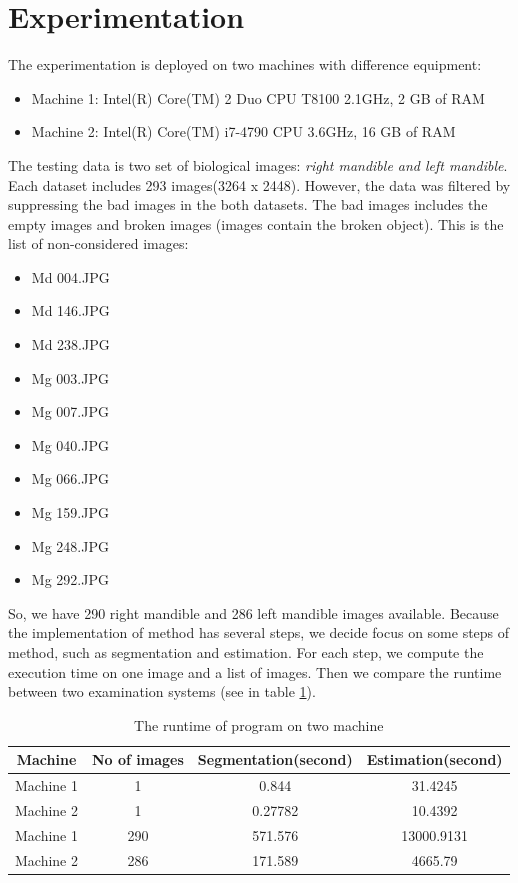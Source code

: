 \section{Experimentation}
The experimentation is deployed on two machines with difference equipment:
\begin{itemize}
\item Machine 1: Intel(R) Core(TM) 2 Duo CPU T8100 2.1GHz, 2 GB of RAM
\item Machine 2: Intel(R) Core(TM) i7-4790 CPU 3.6GHz, 16 GB of RAM
\end{itemize}
The testing data is two set of biological images: \textit{right mandible and left mandible}. Each dataset includes 293 images(3264 x 2448). However, the data was filtered by suppressing the bad images in the both datasets. The bad images includes the empty images and broken images (images contain the broken object). This is the list of non-considered images:
\begin{multicols}{3}
\begin{itemize}
\item Md 004.JPG
\item Md 146.JPG
\item Md 238.JPG
\item Mg 003.JPG
\item Mg 007.JPG
\item Mg 040.JPG
\item Mg 066.JPG
\item Mg 159.JPG
\item Mg 248.JPG
\item Mg 292.JPG
\end{itemize} 
\end{multicols}
So, we have 290 right mandible and 286 left mandible images available. Because the implementation of method has several steps, we decide focus on some steps of method, such as segmentation and estimation. For each step, we compute the execution time on one image and a list of images. Then we compare the runtime between two examination systems (see in table \ref{table_runtime}).
\begin{table}[h]
	\centering
	\begin{tabular}{|c|c|c|c|}
		\hline
		Machine & No of images & Segmentation(second) & Estimation(second) \\ \hline
		Machine 1 & 1 & 0.844 & 31.4245   \\ \hline
		Machine 2 & 1 & 0.27782 & 10.4392 \\ \hline
		Machine 1 & 290 & 571.576 & 13000.9131   \\ \hline
		Machine 2 & 286 & 171.589 & 4665.79\\ \hline
	\end{tabular}	
	\caption{The runtime of program on two machine}		
	\label{table_runtime}
\end{table}
